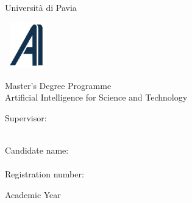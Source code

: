 \begin{titlepage}
\begin{center}
\begin{minipage}[t]{18cm}
\begin{center}
\begin{minipage}[t]{4cm}
\begin{center}
\Large Universit\`a %
di Pavia
\end{center}
\end{minipage}%
\end{center}%
\end{minipage}

\vskip 1.5cm

\begin{center}%
\begin{minipage}{2cm}%
\includegraphics[height=2cm,width=2cm]{logos/logo-ai4st}%
\end{minipage}%
\begin{minipage}{12cm}%
\begin{center}%
\LARGE%
Master's Degree Programme \\
Artificial Intelligence for Science and Technology
\end{center}%
\end{minipage}%
\end{center}%


\vskip 2.5cm

\Huge
	\textbf{\printtitle}

\vskip 4.5cm

\Large

\begin{minipage}[t]{7cm}
	Supervisor:\\
	\printsupervisor \\
\end{minipage}
\hfill
\begin{minipage}[t]{5cm}
	Candidate name:\\
	\printauthor\\
	Registration number:\\
    \regnumber
\end{minipage}

\vskip 1.5cm

	Academic Year \printacademicyear

\end{center}

\vfill
\eject
\end{titlepage}

\clearpage

\restoregeometry

